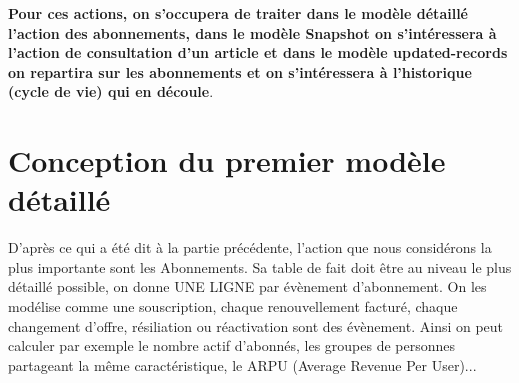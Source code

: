 \documentclass[a4paper,12pt]{article}
\begin{document}
\bigskip

\textbf{Pour ces actions, on s'occupera de traiter dans le modèle détaillé l'action des abonnements, dans le modèle Snapshot on s'intéressera à l'action de consultation d'un article et dans le modèle updated-records on repartira sur les abonnements et on s'intéressera à l'historique (cycle de vie) qui en découle}.

\section{Conception du premier modèle détaillé}

D’après ce qui a été dit à la partie précédente, l’action que nous considérons la plus importante sont les Abonnements. Sa table de fait doit être au niveau le plus détaillé possible, on donne UNE LIGNE par évènement d'abonnement. On les modélise comme une souscription, chaque renouvellement facturé, chaque changement d’offre, résiliation ou réactivation sont des évènement. Ainsi on peut calculer par exemple le nombre actif d’abonnés, les groupes de personnes partageant la même caractéristique, le ARPU (Average Revenue Per User)...

\end{document}
